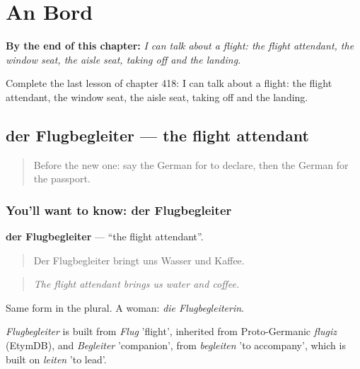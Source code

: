 
\chapter{An Bord}
\label{ch:ge-an-bord}

\begin{chapteropening}
\textbf{By the end of this chapter:} \emph{I can talk about a flight: the flight attendant, the window seat, the aisle seat, taking off and the landing.}

Complete the last lesson of chapter 418: I can talk about a flight: the flight attendant, the window seat, the aisle seat, taking off and the landing.
\end{chapteropening}

\section[der Flugbegleiter]{der Flugbegleiter — the flight attendant}

\label{lesson:GE-C418-flugbegleiter}



\begin{quote}
Before the new one: say the German for to declare, then the German for the passport.
\end{quote}

\subsection*{You'll want to know: der Flugbegleiter}
\textbf{der Flugbegleiter} — \textquotedblleft{}the flight attendant\textquotedblright{}.

\begin{quote}
Der Flugbegleiter bringt uns Wasser und Kaffee.
\end{quote}

\begin{quote}
\emph{The flight attendant brings us water and coffee.}
\end{quote}

Same form in the plural. A woman: \emph{die Flugbegleiterin}.

\begin{cousinweb}
\emph{Flugbegleiter} is built from \emph{Flug} 'flight', inherited from Proto-Germanic \emph{flugiz} (EtymDB), and \emph{Begleiter} 'companion', from \emph{begleiten} 'to accompany', which is built on \emph{leiten} 'to lead'.
\end{cousinweb}

